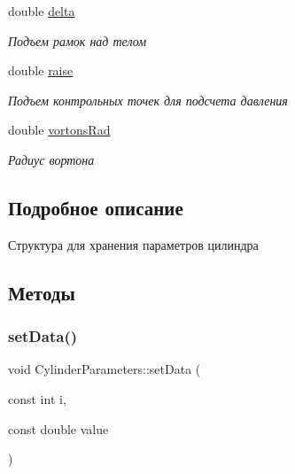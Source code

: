 \begin{DoxyCompactItemize}
\mbox{\label{struct_cylinder_parameters_a27247310a26055113596b6c54a55a5af}} 
double \mbox{\hyperlink{struct_cylinder_parameters_a27247310a26055113596b6c54a55a5af}{delta}}
\begin{DoxyCompactList}\small\item\em Подъем рамок над телом \end{DoxyCompactList}\item 
\mbox{\label{struct_cylinder_parameters_a545a00ab93dc658604a8db70da8af1e5}} 
double \mbox{\hyperlink{struct_cylinder_parameters_a545a00ab93dc658604a8db70da8af1e5}{raise}}
\begin{DoxyCompactList}\small\item\em Подъем контрольных точек для подсчета давления \end{DoxyCompactList}\item 
\mbox{\label{struct_cylinder_parameters_a6ccf0f13e33303f3e502efba1a38991b}} 
double \mbox{\hyperlink{struct_cylinder_parameters_a6ccf0f13e33303f3e502efba1a38991b}{vortons\+Rad}}
\begin{DoxyCompactList}\small\item\em Радиус вортона \end{DoxyCompactList}\end{DoxyCompactItemize}


\subsection{Подробное описание}
Структура для хранения параметров цилиндра 

\subsection{Методы}
\mbox{\label{struct_cylinder_parameters_a5c75f665f942d7e5f179d56dfd77f192}} 
\subsubsection{\texorpdfstring{set\+Data()}{setData()}}
{\footnotesize\ttfamily void Cylinder\+Parameters\+::set\+Data (\begin{DoxyParamCaption}\item[{const int}]{i,  }\item[{const double}]{value }\end{DoxyParamCaption})}

